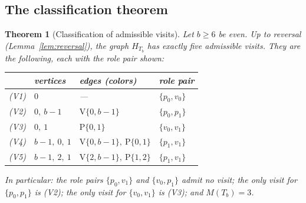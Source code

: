 \documentclass[11pt]{article}
\newtheorem{theorem}{Theorem}[section]
\theoremstyle{definition}
\begin{document}
\subsection{The classification theorem}

\begin{theorem}[Classification of admissible visits]\label{thm:classification}
Let $b \ge 6$ be even. Up to reversal (Lemma~\ref{lem:reversal}), the graph $H_{T_b}$ has
exactly five admissible visits. They are the following, each with the role pair shown:
\begin{center}
\begin{tabular}{clll}
\toprule
 & vertices & edges (colors) & role pair \\
\midrule
(V1) & $0$ & --- & $\{p_0, v_0\}$ \\
(V2) & $0,\ b-1$ & $\mathrm V\{0,b{-}1\}$ & $\{p_0, p_1\}$ \\
(V3) & $0,\ 1$ & $\mathrm P\{0,1\}$ & $\{v_0, v_1\}$ \\
(V4) & $b-1,\ 0,\ 1$ & $\mathrm V\{0,b{-}1\},\ \mathrm P\{0,1\}$ & $\{p_1, v_1\}$ \\
(V5) & $b-1,\ 2,\ 1$ & $\mathrm V\{2,b{-}1\},\ \mathrm P\{1,2\}$ & $\{p_1, v_1\}$ \\
\bottomrule
\end{tabular}
\end{center}
In particular: the role pairs $\{p_0, v_1\}$ and $\{v_0, p_1\}$ admit no visit; the
only visit for $\{p_0, p_1\}$ is (V2); the only visit for $\{v_0, v_1\}$ is (V3); and
$M(T_b) = 3$.
\end{theorem}
\end{document}
